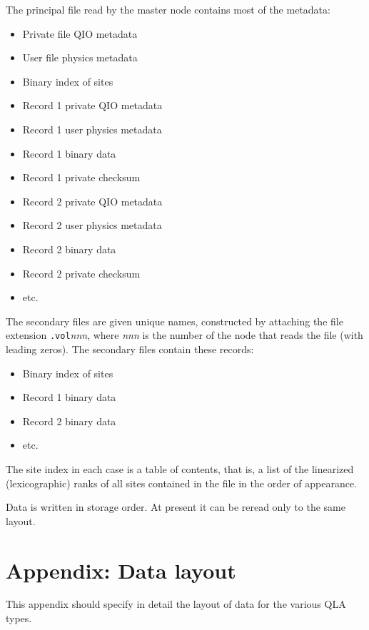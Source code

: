 \documentclass{article}
\begin{document}
The principal file read by the master node contains most of the metadata:

\begin{itemize}
  \item Private file QIO metadata
  \item User file physics metadata
  \item Binary index of sites
  \item Record 1 private QIO metadata
  \item Record 1 user physics metadata
  \item Record 1 binary data
  \item Record 1 private checksum
  \item Record 2 private QIO metadata
  \item Record 2 user physics metadata
  \item Record 2 binary data
  \item Record 2 private checksum
  \item etc.
\end{itemize}

The secondary files are given unique names, constructed by attaching
the file extension {\tt .vol}{\it nnn}, where {\it nnn} is the number
of the node that reads the file (with leading zeros).  The secondary
files contain these records:

\begin{itemize}
  \item Binary index of sites
  \item Record 1 binary data
  \item Record 2 binary data
  \item etc.
\end{itemize}

The site index in each case is a table of contents, that is, a list of
the linearized (lexicographic) ranks of all sites contained in the
file in the order of appearance.

Data is written in storage order.  At present it can be reread only to
the same layout.

\section{Appendix: Data layout}

This appendix should specify in detail the layout of data for the
various QLA types.
\end{document}
